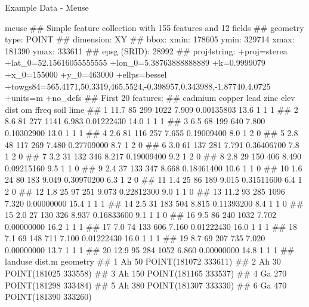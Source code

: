 \documentclass[11pt,ignorenonframetext,]{beamer}
\newenvironment{Shaded}{}{}
\newcommand{\NormalTok}[1]{#1}
\let\oldShaded\Shaded
\let\endoldShaded\endShaded
\renewenvironment{Shaded}{\footnotesize\begin{spacing}{0.9}\oldShaded}{\endoldShaded\end{spacing}}
\begin{document}
\begin{frame}[fragile]{Example Data - Meuse}
\begin{Shaded}
\begin{Highlighting}[]
{\NormalTok{meuse}
\NormalTok{## Simple feature collection with 155 features and 12 fields}
\NormalTok{## geometry type:  POINT}
\NormalTok{## dimension:      XY}
\NormalTok{## bbox:           xmin: 178605 ymin: 329714 xmax: 181390 ymax: 333611}
\NormalTok{## epsg (SRID):    28992}
\NormalTok{## proj4string:    +proj=sterea +lat_0=52.15616055555555 +lon_0=5.38763888888889 +k=0.9999079 +x_0=155000 +y_0=463000 +ellps=bessel +towgs84=565.4171,50.3319,465.5524,-0.398957,0.343988,-1.87740,4.0725 +units=m +no_defs}
\NormalTok{## First 20 features:}
\NormalTok{##    cadmium copper lead zinc  elev       dist   om ffreq soil lime}
\NormalTok{## 1     11.7     85  299 1022 7.909 0.00135803 13.6     1    1    1}
\NormalTok{## 2      8.6     81  277 1141 6.983 0.01222430 14.0     1    1    1}
\NormalTok{## 3      6.5     68  199  640 7.800 0.10302900 13.0     1    1    1}
\NormalTok{## 4      2.6     81  116  257 7.655 0.19009400  8.0     1    2    0}
\NormalTok{## 5      2.8     48  117  269 7.480 0.27709000  8.7     1    2    0}
\NormalTok{## 6      3.0     61  137  281 7.791 0.36406700  7.8     1    2    0}
\NormalTok{## 7      3.2     31  132  346 8.217 0.19009400  9.2     1    2    0}
\NormalTok{## 8      2.8     29  150  406 8.490 0.09215160  9.5     1    1    0}
\NormalTok{## 9      2.4     37  133  347 8.668 0.18461400 10.6     1    1    0}
\NormalTok{## 10     1.6     24   80  183 9.049 0.30970200  6.3     1    2    0}
\NormalTok{## 11     1.4     25   86  189 9.015 0.31511600  6.4     1    2    0}
\NormalTok{## 12     1.8     25   97  251 9.073 0.22812300  9.0     1    1    0}
\NormalTok{## 13    11.2     93  285 1096 7.320 0.00000000 15.4     1    1    1}
\NormalTok{## 14     2.5     31  183  504 8.815 0.11393200  8.4     1    1    0}
\NormalTok{## 15     2.0     27  130  326 8.937 0.16833600  9.1     1    1    0}
\NormalTok{## 16     9.5     86  240 1032 7.702 0.00000000 16.2     1    1    1}
\NormalTok{## 17     7.0     74  133  606 7.160 0.01222430 16.0     1    1    1}
\NormalTok{## 18     7.1     69  148  711 7.100 0.01222430 16.0     1    1    1}
\NormalTok{## 19     8.7     69  207  735 7.020 0.00000000 13.7     1    1    1}
\NormalTok{## 20    12.9     95  284 1052 6.860 0.00000000 14.8     1    1    1}
\NormalTok{##    landuse dist.m             geometry}
\NormalTok{## 1       Ah     50 POINT(181072 333611)}
\NormalTok{## 2       Ah     30 POINT(181025 333558)}
\NormalTok{## 3       Ah    150 POINT(181165 333537)}
\NormalTok{## 4       Ga    270 POINT(181298 333484)}
\NormalTok{## 5       Ah    380 POINT(181307 333330)}
\NormalTok{## 6       Ga    470 POINT(181390 333260)}
}
\end{Highlighting}
\end{Shaded}
\end{frame}
\end{document}
